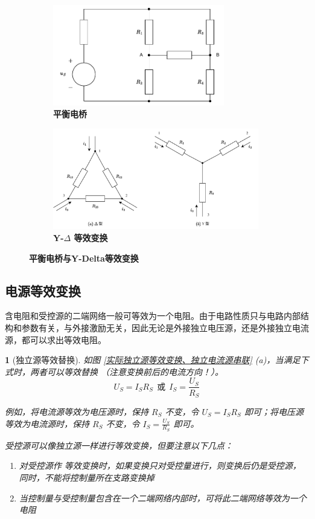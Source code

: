 \documentclass[UTF8]{report}
\theoremstyle{MyLineTheoremStyle} %
\theoremstyle{MyBlockTheoremStyle} %
\theoremstyle{MySubsubsectionStyle} %
\newtheorem{definition}{}
\begin{document}
\begin{figure}[H]\centering
\begin{subfigure}[t]{0.46\textwidth}\centering
    \includegraphics[height=125pt]{assets/1,2/平衡电桥.drawio.pdf}
    \caption{\bfseries 平衡电桥 }
\end{subfigure}\begin{subfigure}[t]{0.54\textwidth}\centering
    \includegraphics[height=125pt]{assets/1,2/YDelta等效变换.drawio.pdf}
    \caption{\bfseries Y-$\Delta$ 等效变换 }
\end{subfigure}
\caption{\bfseries 平衡电桥与Y-Delta等效变换 }\label{平衡电桥与Y-Delta等效变换}
\end{figure}

\subsection{电源等效变换}

含电阻和受控源的二端网络一般可等效为一个电阻。由于电路性质只与电路内部结构和参数有关，与外接激励无关，因此无论是外接独立电压源，还是外接独立电流源，都可以求出等效电阻。


\begin{definition}[独立源等效替换]
如图 \ref{实际独立源等效变换、独立电流源串联} (a)，当满足下式时，两者可以等效替换 {\color{red}（注意变换前后的电流方向！）}。
\begin{equation}
U_S = I_SR_S\ \  \text{或}\ \  I_S = \frac{U_S}{R_S}
\end{equation}

例如，将电流源等效为电压源时，保持 $R_S$ 不变，令 $U_S = I_S R_S$ 即可；将电压源等效为电流源时，保持 $R_S$ 不变，令 $I_S = \frac{U_S}{R_S}$ 即可。

受控源可以像独立源一样进行等效变换，但要注意以下几点：
\begin{enumerate}
\item 对受控源作
等效变换时，如果变换只对受控量进行，则变换后仍是受控源，同时，不能将控制量所在支路变换掉
\item 当控制量与受控制量包含在一个二端网络内部时，可将此二端网络等效为一个电阻
\end{enumerate}
\end{definition}
\end{document}
